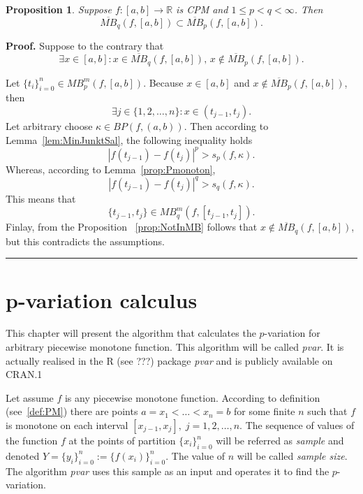 \documentclass[12pt, a4paper]{article}
\newtheorem{proposition}[theorem]{Proposition}
\newenvironment{proof}[1][Proof]{\noindent \textbf{#1.} }{\  \rule{0.5em}{0.5em}}
\numberwithin{equation}{section}
\begin{document}
\begin{proposition}\label{prop:MBMonoton} 
  Suppose $f:[a,b] \rightarrow \mathbb{R}$ is CPM and 
  $1 \leq p < q < \infty$. Then
  $$\overline{MB}_{q}(f,[a,b]) \subset \overline{MB}_{p}(f,[a,b]). $$
\end{proposition}
\begin{proof}
  Suppose to the contrary that
  \begin{equation*}
  \exists x \in[a,b]:x \in \overline{MB}_{q}(f,[a,b]),\,x \notin \overline{MB}_{p}(f,[a,b]).   
  \end{equation*}

  Let $\{t_i\}_{i=0}^n \in MB_p^m(f,[a,b])$. 
  Because $x \in [a,b]$ and $x \notin \overline{MB}_{p}(f,[a,b])$, then
  \begin{equation}\label{eq:xinj}
    \exists j \in\{1,2,\dots,n\}:x\in (t_{j-1},t_j). 
  \end{equation}
  Let arbitrary choose $\kappa \in BP(f,(a,b))$.
  Then according to Lemma~\ref{lem:MinJunktSal}, the following inequality holds
  \begin{equation*}
    |f(t_{j-1})-f(t_{j})|^p > s_p(f, \kappa).
  \end{equation*}
  Whereas, according to Lemma~\ref{prop:Pmonoton},
  \begin{equation*}
    |f(t_{j-1})-f(t_{j})|^q > s_q(f, \kappa).
  \end{equation*} 
  This means that
  $$\{t_{j-1}, t_j \} \in MB_q^m(f,[t_{j-1},t_j]).$$ 
  Finlay, from the Proposition~ \ref{prop:NotInMB} follows that $x \notin \overline{MB}_q(f,[a,b])$,
  but this contradicts the assumptions.
\end{proof}
  
\section{p-variation calculus}  
  
This chapter will present the algorithm that calculates 
the $p$-variation for arbitrary piecewise monotone function. 
This algorithm will be called \emph{pvar}. 
It is actually realised in the R (see ???) package \emph{pvar} and
is publicly available on CRAN.1

Let assume $f$ is any piecewise monotone function.  
According to definition (see~\ref{def:PM}) 
there are points $a=x_1<\dots<x_n=b$ for some finite $n$ such 
that $f$ is monotone on each interval $[x_{j-1},x_j],\;j=1,2,\dots,n$.
The sequence of values of the function $f$ 
at the points of partition $\{x_{i}\}_{i=0}^{n}$ will be
referred as \emph{sample} and denoted $Y=\{y_{i}\}_{i=0}^{n}:=\{f(x_{i})\}_{i=0}^{n}$. 
The value of $n$ will be called \emph{sample size}.
The  algorithm  \emph{pvar} uses this sample as an input 
and operates it to find the $p$-variation.
\end{document}

